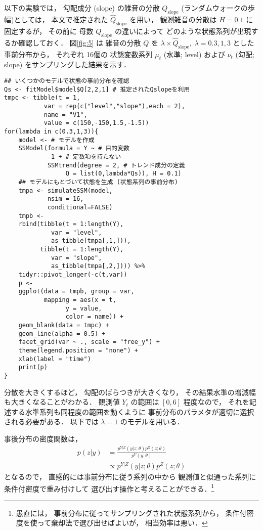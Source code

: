 \documentclass[10pt,oneside,fleqn]{scrartcl}
\begin{document}
以下の実験では，
勾配成分 (slope) の雑音の分散 \(Q_{\mathrm{slope}}\)
(ランダムウォークの歩幅)としては，
本文で推定された \(\hat{Q}_{\mathrm{slope}}\) を用い，
観測雑音の分散は \(H=0.1\) に固定するが，
その前に 母数 \(Q_{\mathrm{slope}}\) の違いによって
どのような状態系列が出現するか確認しておく．
図\ref{fig:5} は
雑音の分散 \(Q\) を
\(\lambda\times \hat{Q}_{\mathrm{slope}},\;\lambda=0.3,1,3\)
とした事前分布から，
それぞれ
16個の
状態変数系列
\(\mu_{t}\) (水準; level)
および
\(\nu_{t}\) (勾配; slope)
をサンプリングした結果を示す．

\begin{figure*}[htbp]
  \centering
\end{figure*}

\begin{verbatim}
## いくつかのモデルで状態の事前分布を確認
Qs <- fitModel$model$Q[2,2,1] # 推定されたQslopeを利用
tmpc <- tibble(t = 1,
	       var = rep(c("level","slope"),each = 2),
	       name = "V1",
	       value = c(150,-150,1.5,-1.5))
for(lambda in c(0.3,1,3)){
    model <- # モデルを作成
	SSModel(formula = Y ~ # 目的変数
		    -1 + # 定数項を持たない
		    SSMtrend(degree = 2, # トレンド成分の定義
			     Q = list(0,lambda*Qs)), H = 0.1)
    ## モデルにもとづいて状態を生成 (状態系列の事前分布)
    tmpa <- simulateSSM(model,
			nsim = 16,
			conditional=FALSE)
    tmpb <- 
	rbind(tibble(t = 1:length(Y),
		     var = "level",
		     as_tibble(tmpa[,1,])),
	      tibble(t = 1:length(Y),
		     var = "slope",
		     as_tibble(tmpa[,2,]))) %>%
	tidyr::pivot_longer(-c(t,var)) 
    p <- 
	ggplot(data = tmpb, group = var,
	       mapping = aes(x = t,
			     y = value,
			     color = name)) +
	geom_blank(data = tmpc) +
	geom_line(alpha = 0.5) +
	facet_grid(var ~ ., scale = "free_y") +
	theme(legend.position = "none") +
	xlab(label = "time")
    print(p)
}
\end{verbatim}

分散を大きくするほど，
勾配のばらつきが大きくなり，
その結果水準の増減幅も大きくなることがわかる．
観測値 \(Y_{t}\) の範囲は \([0,6]\) 程度なので，
それを記述する水準系列も同程度の範囲を動くように
事前分布のパラメタが適切に選択される必要がある．
以下では
\(\lambda=1\)
のモデルを用いる．

事後分布の密度関数は，
\begin{align}
  p(z|y)
  &=\frac{p^{Y|Z}(y|z;\theta)p^{Z}(z;\theta)}{p^{Y}(y;\theta)}\\
  &\propto p^{Y|Z}(y|z;\theta)p^{Z}(z;\theta)
\end{align}
となるので，
直感的には事前分布に従う系列の中から
観測値と似通った系列に条件付密度で重み付けして
選び出す操作と考えることができる．\footnote{愚直には，
事前分布に従ってサンプリングされた状態系列から，
条件付密度を使って棄却法で選び出せばよいが，
相当効率は悪い．}
\end{document}
